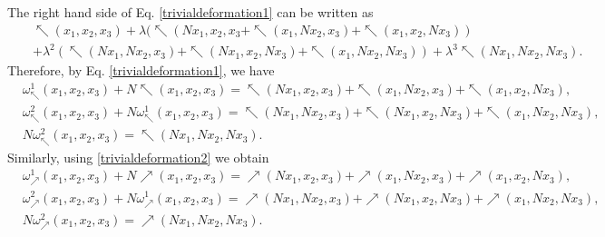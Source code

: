 \documentclass[a4paper,11pt]{article}
\def\nw{\nwarrow}
\def\ne{\nearrow}
\theoremstyle{definition}
\begin{document}
The right hand side of Eq. \eqref{trivialdeformation1} can be written as
\begin{eqnarray*}
&&\nw(x_1,x_2,x_3)+
\lambda(\nw(Nx_1,x_2,x_3+\nw(x_1,Nx_2,x_3)
+\nw(x_1,x_2,Nx_3))\\&&
+\lambda^2(\nw(Nx_1,Nx_2,x_3)+\nw(Nx_1,x_2,Nx_3)+\nw(x_1,Nx_2,Nx_3))+
\lambda^3\nw(Nx_1,Nx_2,Nx_3).
\end{eqnarray*}
Therefore, by Eq. \eqref{trivialdeformation1}, we have
{\small\begin{align*}
&\omega_\nw^1(x_1,x_2,x_3)+N\nw(x_1,x_2,x_3)=\nw(Nx_1,x_2,x_3)+
\nw(x_1,Nx_2,x_3)+\nw(x_1,x_2,Nx_3),\\
&\omega_\nw^2(x_1,x_2,x_3)+N\omega_\nw^1(x_1,x_2,x_3)
=\nw(Nx_1,Nx_2,x_3)+\nw(Nx_1,x_2,Nx_3)+\nw(x_1,Nx_2,Nx_3),\\
&N\omega_\nw^2(x_1,x_2,x_3)=\nw(Nx_1,Nx_2,Nx_3).
\end{align*}}
Similarly, using \eqref{trivialdeformation2} we obtain
{\small\begin{align*}
&\omega_\ne^1(x_1,x_2,x_3)+N\ne(x_1,x_2,x_3)=\ne(Nx_1,x_2,x_3)+
\ne(x_1,Nx_2,x_3)+\ne(x_1,x_2,Nx_3),\\
&\omega_\ne^2(x_1,x_2,x_3)+N\omega_\ne^1(x_1,x_2,x_3)
=\ne(Nx_1,Nx_2,x_3)+\ne(Nx_1,x_2,Nx_3)+\ne(x_1,Nx_2,Nx_3),\\
&N\omega_\ne^2(x_1,x_2,x_3)=\ne(Nx_1,Nx_2,Nx_3).
\end{align*}}
\end{document}
